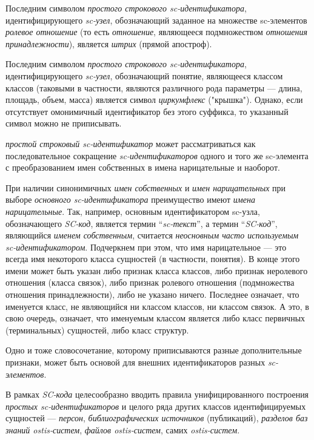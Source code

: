 Последним символом \textit{простого строкового sc-идентификатора}, идентифицирующего \textit{sc-узел}, обозначающий заданное на множестве sc-элементов \textit{ролевое отношение} (то есть \textit{отношение}, являющееся подмножеством \textit{отношения принадлежности}), является \textit{штрих} (прямой апостроф).

Последним символом \textit{простого строкового sc-идентификатора}, идентифицирующего \textit{sc-узел}, обозначающий понятие, являющееся классом классов (таковыми в частности, являются различного рода параметры --- длина, площадь, объем, масса) является символ \textit{циркумфлекс} ("крышка"{}). Однако, если отсутствует омонимичный идентификатор без этого суффикса, то указанный символ можно не приписывать.

\textit{простой строковый sc-идентификатор} может рассматриваться как последовательное сокращение \textit{sc-идентификаторов} одного и того же sc-элемента с преобразованием имен собственных в имена нарицательные и наоборот.

При наличии синонимичных \textit{имен собственных} и \textit{имен нарицательных} при выборе \textit{основного sc-идентификатора} преимущество имеют \textit{имена нарицательные}. Так, например, основным идентификатором sc-узла, обозначающего \textit{SC-код}, является термин ``\textit{sc-текст}'', а термин ``\textit{SC-код}'', являющийся \textit{именем собственным}, считается \textit{неосновным часто используемым sc-идентификатором}. Подчеркнем при этом, что имя нарицательное --- это всегда имя некоторого класса сущностей (в частности, понятия). В конце этого имени может быть указан либо признак класса классов, либо признак неролевого отношения (класса связок), либо признак ролевого отношения (подмножества отношения принадлежности), либо не указано ничего. Последнее означает, что именуется класс, не являющийся ни классом классов, ни классом связок. А это, в свою очередь, означает, что именуемым классом является либо класс первичных (терминальных) сущностей, либо класс структур.

Одно и тоже словосочетание, которому приписываются разные дополнительные признаки, может быть основой для внешних идентификаторов разных \textit{sc-элементов}.

В рамках \textit{SC-кода} целесообразно вводить правила унифицированного построения \textit{простых sc-идентификаторов} и целого ряда других классов идентифицируемых сущностей --- \textit{персон}, \textit{библиографических источников} (публикаций), \textit{разделов баз знаний ostis-систем}, \textit{файлов ostis-систем}, самих \textit{ostis-систем}.

